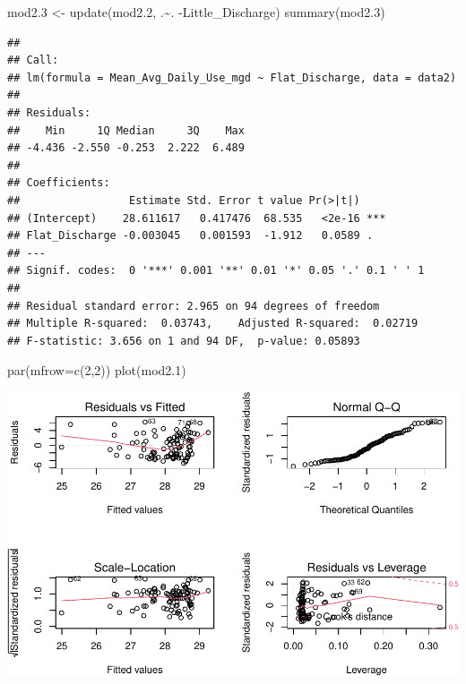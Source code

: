 \documentclass[
  12pt,
]{article}
\newenvironment{Shaded}{\begin{snugshade}}{\end{snugshade}}
\newcommand{\AttributeTok}[1]{\textcolor[rgb]{0.77,0.63,0.00}{#1}}
\newcommand{\DecValTok}[1]{\textcolor[rgb]{0.00,0.00,0.81}{#1}}
\newcommand{\FloatTok}[1]{\textcolor[rgb]{0.00,0.00,0.81}{#1}}
\newcommand{\FunctionTok}[1]{\textcolor[rgb]{0.00,0.00,0.00}{#1}}
\newcommand{\NormalTok}[1]{#1}
\newcommand{\OtherTok}[1]{\textcolor[rgb]{0.56,0.35,0.01}{#1}}
\newcommand{\SpecialCharTok}[1]{\textcolor[rgb]{0.00,0.00,0.00}{#1}}
\begin{document}
\begin{Shaded}
\begin{Highlighting}[]
\NormalTok{mod2}\FloatTok{.3} \OtherTok{\textless{}{-}} \FunctionTok{update}\NormalTok{(mod2}\FloatTok{.2}\NormalTok{, .}\SpecialCharTok{\textasciitilde{}}\NormalTok{. }\SpecialCharTok{{-}}\NormalTok{Little\_Discharge)}
\FunctionTok{summary}\NormalTok{(mod2}\FloatTok{.3}\NormalTok{)}
\end{Highlighting}
\end{Shaded}

\begin{verbatim}
## 
## Call:
## lm(formula = Mean_Avg_Daily_Use_mgd ~ Flat_Discharge, data = data2)
## 
## Residuals:
##    Min     1Q Median     3Q    Max 
## -4.436 -2.550 -0.253  2.222  6.489 
## 
## Coefficients:
##                 Estimate Std. Error t value Pr(>|t|)    
## (Intercept)    28.611617   0.417476  68.535   <2e-16 ***
## Flat_Discharge -0.003045   0.001593  -1.912   0.0589 .  
## ---
## Signif. codes:  0 '***' 0.001 '**' 0.01 '*' 0.05 '.' 0.1 ' ' 1
## 
## Residual standard error: 2.965 on 94 degrees of freedom
## Multiple R-squared:  0.03743,    Adjusted R-squared:  0.02719 
## F-statistic: 3.656 on 1 and 94 DF,  p-value: 0.05893
\end{verbatim}

\begin{Shaded}
\begin{Highlighting}[]
\FunctionTok{par}\NormalTok{(}\AttributeTok{mfrow=}\FunctionTok{c}\NormalTok{(}\DecValTok{2}\NormalTok{,}\DecValTok{2}\NormalTok{))}
\FunctionTok{plot}\NormalTok{(mod2}\FloatTok{.1}\NormalTok{)}
\end{Highlighting}
\end{Shaded}

\includegraphics{Project_files/figure-latex/river discharge and withdraws-1.pdf}
\end{document}
